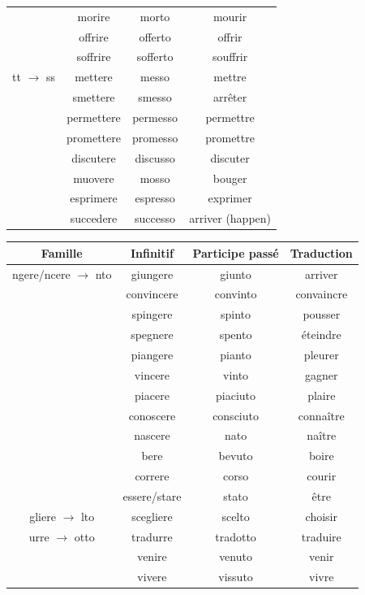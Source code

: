 \documentclass[12pt, openany]{report}
\begin{document}
\begin{center}
\begin{tabular}{c|c|c|c}
        & morire & morto & mourir\\
        & offrire & offerto & offrir\\
        & soffrire & sofferto & souffrir\\ \hline 
        tt $\to$ ss & mettere & messo & mettre\\
        & smettere & smesso & arrêter\\
        & permettere & permesso & permettre \\
        & promettere & promesso & promettre \\
        & discutere & discusso & discuter\\
        & muovere & mosso & bouger\\
        & esprimere & espresso & exprimer \\
        & succedere & successo & arriver (happen)\\ \hline 
    \end{tabular}
\end{center}
\begin{center}
    \begin{tabular}{c|c|c|c}
        Famille & Infinitif & Participe passé & Traduction\\ \hline 
        ngere/ncere $\to$ nto & giungere & giunto & arriver\\
        & convincere & convinto & convaincre\\
        & spingere & spinto & pousser\\
        & spegnere & spento & éteindre\\
        & piangere & pianto & pleurer \\
        & vincere & vinto & gagner \\ \hline 
        & piacere & piaciuto & plaire \\
        & conoscere & consciuto & connaître \\
        & nascere & nato & naître\\
        & bere & bevuto & boire \\
        & correre & corso & courir \\
        & essere/stare & stato & être \\
        gliere $\to$ lto & scegliere & scelto & choisir \\
        urre $\to$ otto & tradurre & tradotto & traduire\\
        & venire & venuto & venir \\
        & vivere & vissuto & vivre \\
    \end{tabular}
\end{center}
\end{document}
